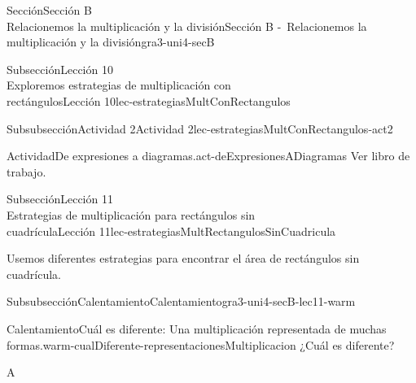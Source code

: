 \begin{sectionptx}{Sección}{{\Large Sección B\\}Relacionemos la multiplicación y la división}{}{Sección B -~Relacionemos la multiplicación y la división}{}{}{gra3-uni4-secB}
\begin{subsectionptx}{Subsección}{{\normalsize Lección 10\\[-0.05cm]}Exploremos estrategias de multiplicación con\\rectángulos}{}{Lección 10}{}{}{lec-estrategiasMultConRectangulos}
\begin{subsubsectionptx}{Subsubsección}{Actividad 2}{}{Actividad 2}{}{}{lec-estrategiasMultConRectangulos-act2}
\begin{activity}{Actividad}{De expresiones a diagramas.}{act-deExpresionesADiagramas}
Ver libro de trabajo.
\end{activity}%
\end{subsubsectionptx}
\end{subsectionptx}
%
%
\typeout{************************************************}
\typeout{************************************************}
%
\clearpage
\begin{subsectionptx}{Subsección}{{\normalsize Lección 11\\[-0.05cm]}Estrategias de multiplicación para rectángulos sin\\cuadrícula}{}{Lección 11}{}{}{lec-estrategiasMultRectangulosSinCuadricula}
\begin{introduction}{}%
Usemos diferentes estrategias para encontrar el área de rectángulos sin cuadrícula.%
\end{introduction}%
%
%
\typeout{************************************************}
\typeout{************************************************}
%
\begin{subsubsectionptx}{Subsubsección}{Calentamiento}{}{Calentamiento}{}{}{gra3-uni4-secB-lec11-warm}
\begin{exploration}{Calentamiento}{Cuál es diferente: Una multiplicación representada de muchas formas.}{warm-cualDiferente-representacionesMultiplicacion}%
¿Cuál es diferente?%
\begin{sidebyside}{2}{0.05}{0.05}{0.1}%
\begin{sbspanel}{0.4}%
A%
\par

\end{sbspanel}
\end{sidebyside}
\end{exploration}
\end{subsubsectionptx}
\end{subsectionptx}
\end{sectionptx}
